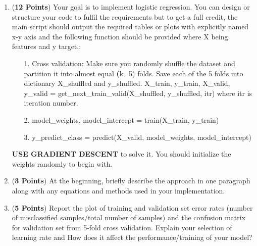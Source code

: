 \documentclass[11pt]{scrartcl}
\begin{document}
	\begin{enumerate}[label=\alph*)]
		\item (\textbf{12 Points})
		Your goal is to implement logistic regression. You can design or structure your code to fulfil the requirements but to get a full credit, the main script should output the required tables or plots with explicitly named x-y axis and the following function should be provided where X being features and y target.:
		\begin{itemize}
			\item [1.] Cross validation: Make sure you randomly shuffle the dataset and partition it into almost equal \textbf(k=5) folds. Save each of the 5 folds into dictionary  X\_shuffled and y\_shuffled.
			\newline
			X\_train, y\_train, X\_valid, y\_valid = get\_next\_train\_valid(X\_shuffled, y\_shuffled, itr) where itr is iteration number.
			\item[2.] model\_weights, model\_intercept = train(X\_train, y\_train)
			\item[3.] y\_predict\_class = predict(X\_valid, model\_weights, model\_intercept)
		\end{itemize}
		
		\textbf{USE GRADIENT DESCENT} to solve it. You should initialize the weights randomly to begin with.
		
		
		\item (\textbf{3 Points})
		At the beginning, briefly describe the approach in one paragraph along with any equations and methods used in your implementation. 
		
		
		\item (\textbf{5 Points})
		Report the plot of training and validation set error rates (number of misclassified samples/total number of samples) and the confusion matrix for validation set from 5-fold cross validation. 
		Explain your selection of learning rate and How does it affect the performance/training of your model? 
		
	\end{enumerate}
	
\end{document}
